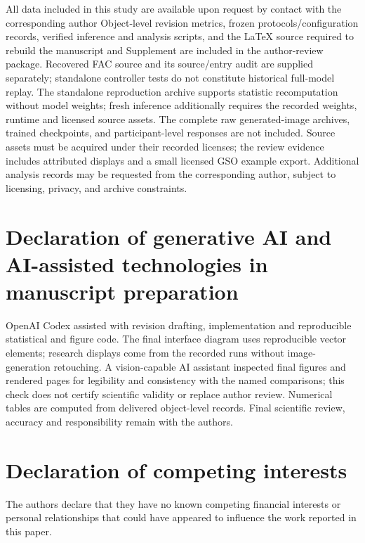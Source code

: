 \documentclass[times,twocolumn,final]{elsarticle}
\providecommand{\DIFadd}[1]{{\protect\color{blue} \sf #1}} %
\providecommand{\DIFdel}[1]{{\protect\color{red} \scriptsize #1}} %
\providecommand{\DIFaddbegin}{} %
\providecommand{\DIFaddend}{} %
\providecommand{\DIFdelbegin}{} %
\providecommand{\DIFdelend}{} %
\begin{document}
\DIFdelbegin \DIFdel{All data included in this study are available upon request by contact with the corresponding author}\DIFdelend \DIFaddbegin \DIFadd{Object-level revision metrics, frozen protocols/configuration records, verified inference and analysis scripts, and the LaTeX source required to rebuild the manuscript and Supplement are included in the author-review package. Recovered FAC source and its source/entry audit are supplied separately; standalone controller tests do not constitute historical full-model replay. The standalone reproduction archive supports statistic recomputation without model weights; fresh inference additionally requires the recorded weights, runtime and licensed source assets. The complete raw generated-image archives, trained checkpoints, and participant-level responses are not included. Source assets must be acquired under their recorded licenses; the review evidence includes attributed displays and a small licensed GSO example export. Additional analysis records may be requested from the corresponding author, subject to licensing, privacy, and archive constraints.
}

\section*{\DIFadd{Declaration of generative AI and AI-assisted technologies in manuscript preparation}}
\DIFadd{OpenAI Codex assisted with revision drafting, implementation and reproducible statistical and figure code. The final interface diagram uses reproducible vector elements; research displays come from the recorded runs without image-generation retouching. A vision-capable AI assistant inspected final figures and rendered pages for legibility and consistency with the named comparisons; this check does not certify scientific validity or replace author review. Numerical tables are computed from delivered object-level records. Final scientific review, accuracy and responsibility remain with the authors}\DIFaddend .

\section*{Declaration of competing interests}

The authors declare that they have no known competing financial interests or personal relationships that could have appeared to influence the work reported in this paper.
\end{document}
